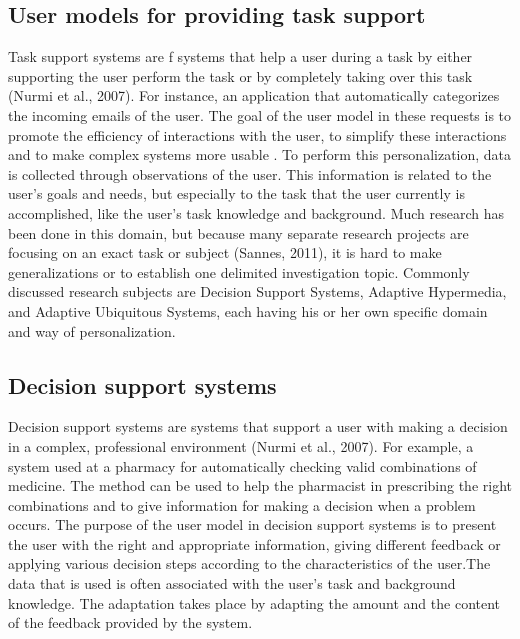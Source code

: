 \subsection{User models for providing task support}

Task support systems are f systems that help a user during a task by either
supporting the user perform the task or by completely taking over this task
\cite{brun2010compass}(Nurmi et al., 2007). For instance,  an application that
automatically categorizes the incoming emails of the user. The goal of the user
model in these requests is to promote the efficiency of interactions with the
user, to simplify these interactions and to make complex systems more usable
\cite{razmerita2009user}\cite{fischer2001user}.
To perform this personalization, data is
collected through observations of the user. This information is related to the
user’s goals and needs, but especially to the task that the user currently is
accomplished, like the user’s task knowledge and background. Much research has
been done in this domain, but because many separate research projects are
focusing on an exact task or subject \cite{}(Sannes, 2011), it is hard to make
generalizations or to establish one delimited investigation topic. Commonly
discussed research subjects are Decision Support Systems,  Adaptive Hypermedia,
and Adaptive Ubiquitous Systems, each having his or her own specific domain and
way of personalization.  

\subsection{Decision support systems}

Decision support systems are systems that support a user with making a decision
in a complex, professional environment \cite{} (Nurmi et al., 2007). For example,  a
system used at a pharmacy for automatically checking valid combinations of
medicine. The method can be used to help the pharmacist in prescribing the right
combinations and to give information for making a decision when a problem
occurs.  The purpose of the user model in decision support systems is to present
the user with the right and appropriate information, giving different feedback
or applying various decision steps according to the characteristics of the
user.The data that is used is often associated with the user’s task and
background knowledge.    The adaptation takes place by adapting the amount and
the content of the feedback provided by the system.


